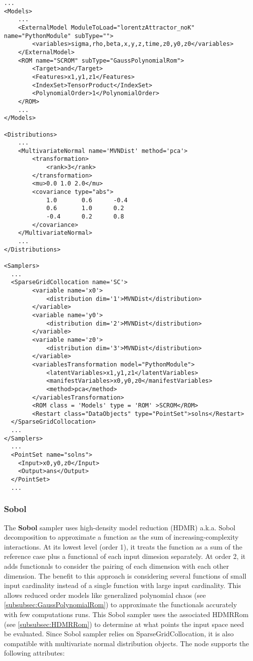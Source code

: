 \begin{lstlisting}[style=XML,morekeywords={ND,grid}]
...
<Models>
    ...
    <ExternalModel ModuleToLoad="lorentzAttractor_noK" name="PythonModule" subType="">
        <variables>sigma,rho,beta,x,y,z,time,z0,y0,z0</variables>
    </ExternalModel>
    <ROM name="SCROM" subType="GaussPolynomialRom">
        <Target>and</Target>
        <Features>x1,y1,z1</Features>
        <IndexSet>TensorProduct</IndexSet>
        <PolynomialOrder>1</PolynomialOrder>
    </ROM>
    ...
</Models>

<Distributions>
    ...
    <MultivariateNormal name='MVNDist' method='pca'>
        <transformation>
            <rank>3</rank>
        </transformation>
        <mu>0.0 1.0 2.0</mu>
        <covariance type="abs">
            1.0       0.6      -0.4
            0.6       1.0      0.2
            -0.4      0.2      0.8
        </covariance>
    </MultivariateNormal>
    ...
</Distributions>

<Samplers>
  ...
  <SparseGridCollocation name='SC'>
        <variable name='x0'>
            <distribution dim='1'>MVNDist</distribution>
        </variable>
        <variable name='y0'>
            <distribution dim='2'>MVNDist</distribution>
        </variable>
        <variable name='z0'>
            <distribution dim='3'>MVNDist</distribution>
        </variable>
        <variablesTransformation model="PythonModule">
            <latentVariables>x1,y1,z1</latentVariables>
            <manifestVariables>x0,y0,z0</manifestVariables>
            <method>pca</method>
        </variablesTransformation>
        <ROM class = 'Models' type = 'ROM' >SCROM</ROM>
        <Restart class="DataObjects" type="PointSet">solns</Restart>
  </SparseGridCollocation>
  ...
</Samplers>
  ...
  <PointSet name="solns">
    <Input>x0,y0,z0</Input>
    <Output>ans</Output>
  </PointSet>
  ...
\end{lstlisting}

\subsubsection{Sobol}
\label{subsubsubsec:SobolSampler}
The \textbf{Sobol} sampler uses high-density model reduction (HDMR) a.k.a. Sobol decomposition to approximate a function as the sum of increasing-complexity
interactions.  At its lowest level (order 1), it treats the function as a sum of the reference case plus a functional of each input dimesion separately.  At
order 2, it adds functionals to consider the pairing of each dimension with each other dimension.  The benefit to this approach is considering several functions
of small input cardinality instead of a single function with large input cardinality.  This allows reduced order models like generalized polynomial chaos
(see \ref{subsubsec:GaussPolynomialRom}) to approximate the functionals accurately with few computations runs.  This Sobol sampler uses the associated HDMRRom
(see \ref{subsubsec:HDMRRom}) to determine at what points the input space need be evaluated. Since Sobol sampler relies on SparseGridCollocation, it is also compatible with
multivariate normal distribution objects. The  node supports the following attributes:

